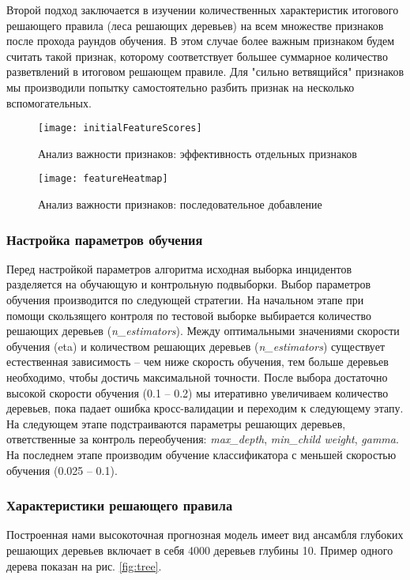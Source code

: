 Второй подход заключается в изучении количественных характеристик итогового решающего правила (леса решающих деревьев) на всем множестве признаков после прохода раундов обучения. В этом случае более важным признаком будем считать такой признак, которому соответствует большее суммарное количество разветвлений в итоговом решающем правиле. Для "сильно ветвящийся" признаков мы производили попытку самостоятельно разбить признак на несколько вспомогательных.

\begin{figure*}
\centering
\texttt{[image: initialFeatureScores]}
\caption{Анализ важности признаков: эффективность отдельных признаков}
\centering
\label{fig:initialFeatureScores}
\end{figure*}



\begin{figure*}
\centering
\texttt{[image: featureHeatmap]}
\caption{Анализ важности признаков: последовательное добавление}
\centering
\label{fig:featureHeatmap}
\end{figure*}

\subsubsection{Настройка параметров обучения}
Перед настройкой параметров алгоритма исходная выборка инцидентов разделяется на обучающую и контрольную подвыборки. Выбор параметров обучения производится по следующей стратегии.
На начальном этапе при помощи скользящего контроля по тестовой выборке выбирается количество решающих деревьев (\textit{n\_estimators}). Между оптимальными значениями скорости обучения (eta) и количеством решающих деревьев (\textit{n\_estimators}) существует естественная зависимость – чем ниже скорость обучения, тем больше деревьев необходимо, чтобы достичь максимальной точности. После выбора достаточно высокой скорости обучения (0.1 – 0.2) мы итеративно увеличиваем количество деревьев, пока падает ошибка кросс-валидации и переходим к следующему этапу. На следующем этапе подстраиваются параметры решающих деревьев, ответственные за контроль переобучения: \textit{max\_depth}, \textit{min\_child weight}, \textit{gamma}. На последнем этапе производим обучение классификатора с меньшей скоростью обучения (0.025 – 0.1).

\subsubsection{Характеристики решающего правила}
Построенная нами высокоточная прогнозная модель имеет вид ансамбля глубоких решающих деревьев \cite{friedman2001greedy} 
включает в себя 4000 деревьев глубины 10. Пример одного дерева показан на рис. \ref{fig:tree}.

